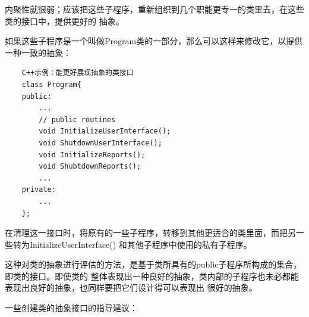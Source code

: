 \documentclass{article}
\begin{document}
内聚性就很弱；应该把这些子程序，重新组织到几个职能更专一的类里去，在这些类的接口中，提供更好的
抽象。
\par
如果这些子程序是一个叫做Program类的一部分，那么可以这样来修改它，以提供一种一致的抽象：
\begin{lstlisting}
    C++示例：能更好展现抽象的类接口
    class Program{
    public:
        ...
        // public routines
        void InitializeUserInterface();
        void ShutdownUserInterface();
        void InitializeReports();
        void ShubtdownReports();
        ...
    private:
        ...
    };
\end{lstlisting}
在清理这一接口时，将原有的一些子程序，转移到其他更适合的类里面，而把另一些转为InitializeUserInterface()
和其他子程序中使用的私有子程序。
\par
这种对类的抽象进行评估的方法，是基于类所具有的public子程序所构成的集合，即类的接口。即使类的
整体表现出一种良好的抽象，类内部的子程序也未必都能表现出良好的抽象，也同样要把它们设计得可以表现出
很好的抽象。
\par
一些创建类的抽象接口的指导建议：
\end{document}
